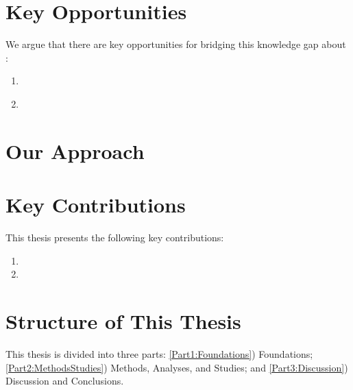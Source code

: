 

\section{Key Opportunities} \label{th:KeyOpportunities} %
We argue that there are  key opportunities for bridging this knowledge gap about :
\begin{enumerate}
	\item {} \\
	
	\item {} \\
	
\end{enumerate}


\section{Our Approach}


\section{Key Contributions} \label{th:KeyContributions}
This thesis presents the following key contributions:
\begin{enumerate}
	\item {}
	\item {}
\end{enumerate}


\section{Structure of This Thesis} \label{sec:ThesisStructure}
This thesis is divided into three parts: 
  \ref{Part1:Foundations}) Foundations;
  \ref{Part2:MethodsStudies}) Methods, Analyses, and Studies;  and
  \ref{Part3:Discussion}) Discussion and Conclusions.
  

